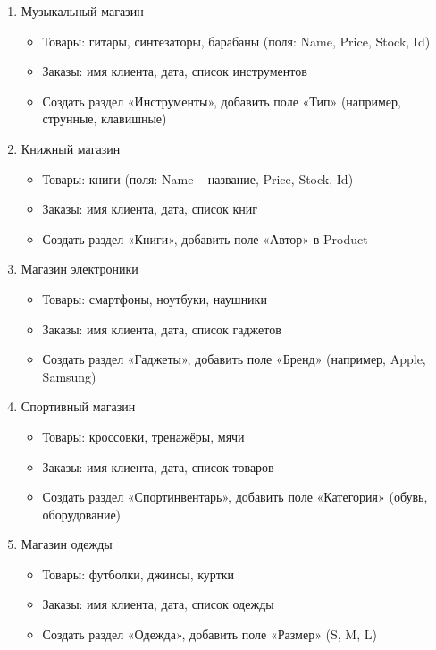 \documentclass[12pt]{article}
\renewcommand{\texttt}[1]{{\small\ttfamily #1}}
\begin{document}
\begin{enumerate}
	\item Музыкальный магазин
	      \begin{itemize}
		      \item Товары: гитары, синтезаторы, барабаны (поля: \texttt{Name}, \texttt{Price}, \texttt{Stock}, \texttt{Id})
		      \item Заказы: имя клиента, дата, список инструментов
		      \item Создать раздел «Инструменты», добавить поле «Тип» (например, струнные, клавишные)
	      \end{itemize}

	\item Книжный магазин
	      \begin{itemize}
		      \item Товары: книги (поля: \texttt{Name} -- название, \texttt{Price}, \texttt{Stock}, \texttt{Id})
		      \item Заказы: имя клиента, дата, список книг
		      \item Создать раздел «Книги», добавить поле «Автор» в \texttt{Product}
	      \end{itemize}

	\item Магазин электроники
	      \begin{itemize}
		      \item Товары: смартфоны, ноутбуки, наушники
		      \item Заказы: имя клиента, дата, список гаджетов
		      \item Создать раздел «Гаджеты», добавить поле «Бренд» (например, Apple, Samsung)
	      \end{itemize}


	\item Спортивный магазин
	      \begin{itemize}
		      \item Товары: кроссовки, тренажёры, мячи
		      \item Заказы: имя клиента, дата, список товаров
		      \item Создать раздел «Спортинвентарь», добавить поле «Категория» (обувь, оборудование)
	      \end{itemize}

	\item Магазин одежды
	      \begin{itemize}
		      \item Товары: футболки, джинсы, куртки
		      \item Заказы: имя клиента, дата, список одежды
		      \item Создать раздел «Одежда», добавить поле «Размер» (S, M, L)
	      \end{itemize}


\end{enumerate}
\end{document}
